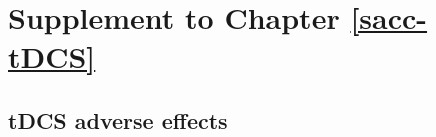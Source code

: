 \documentclass[11pt,]{memoir}
\renewcommand{\arraystretch}{1.5} %
\begin{document}
\hypertarget{appendix-appendix}{%
\appendix}


\cleardoublepage
{}
{}
\appendixpage*
\setlength\beforechapskip{-\baselineskip}

\hypertarget{sacc-tDCS-supplement}{%
\chapter{Supplement to Chapter \ref{sacc-tDCS}}\label{sacc-tDCS-supplement}}

\hypertarget{tdcs-adverse-effects}{%
\section{tDCS adverse effects}\label{tdcs-adverse-effects}}

\begingroup
\renewcommand{\arraystretch}{1.25}
\setlength{\LTleft}{-20cm plus -1fill}
\setlength{\LTright}{\LTleft}

\begingroup\fontsize{8}{10}\selectfont
\end{document}
